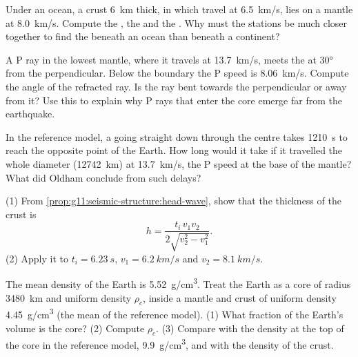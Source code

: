 \begin{exercise}[$\star\star$]\label{exo:g11:seismic-structure:9}
Under an ocean, a crust \qty{6}{km} thick, in which  travel at
\qty{6.5}{km/s}, lies on a mantle at \qty{8.0}{km/s}. Compute the , the  and the . Why must the stations be
much closer together to find the  beneath an ocean than beneath a
continent?
\end{exercise}

\begin{exercise}[$\star\star$]\label{exo:g11:seismic-structure:10}
A P ray in the lowest mantle, where it travels at \qty{13.7}{km/s}, meets the
 at \ang{30} from the perpendicular. Below the boundary
the P speed is \qty{8.06}{km/s}. Compute the angle of the refracted ray. Is the
ray bent towards the perpendicular or away from it? Use this to explain why P
rays that enter the core emerge far from the earthquake.
\end{exercise}

\begin{exercise}[$\star\star$]\label{exo:g11:seismic-structure:11}
In the reference model, a  going straight down through the centre takes
\qty{1210}{s} to reach the opposite point of the Earth. How long would it take
if it travelled the whole diameter (\qty{12742}{km}) at \qty{13.7}{km/s}, the
P speed at the base of the mantle? What did Oldham conclude from such delays?
\end{exercise}

\begin{exercise}[$\star\star\star$]\label{exo:g11:seismic-structure:12}
(1) From \cref{prop:g11:seismic-structure:head-wave}, show that the thickness
of the crust is
\[
  h = \frac{t_i\,v_1 v_2}{2\sqrt{v_2^2 - v_1^2}}.
\]
(2) Apply it to $t_i = \qty{6.23}{s}$, $v_1 = \qty{6.2}{km/s}$ and
$v_2 = \qty{8.1}{km/s}$.
\end{exercise}

\begin{exercise}[$\star\star\star$]\label{exo:g11:seismic-structure:13}
The mean density of the Earth is \qty{5.52}{g/cm^3}. Treat the Earth as a
core of radius \qty{3480}{km} and uniform density $\rho_c$, inside a mantle
and crust of uniform density \qty{4.45}{g/cm^3} (the mean of the reference
model). (1) What fraction of the Earth's volume is the core? (2) Compute
$\rho_c$. (3) Compare with the density at the top of the core in the
reference model, \qty{9.9}{g/cm^3}, and with the density of the crust.
\end{exercise}

